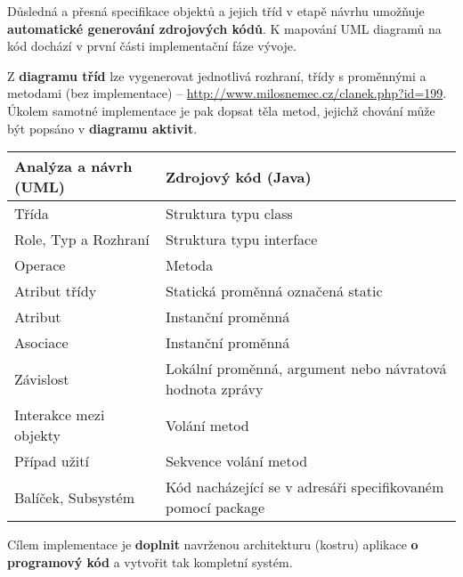 Důsledná a přesná specifikace {objektů} a jejich {tříd} v etapě návrhu umožňuje\textbf{ automatické generování zdrojových kódů}. K mapování UML diagramů na kód dochází v první části implementační fáze vývoje.

Z \textbf{diagramu tříd} lze vygenerovat jednotlivá rozhraní, třídy s proměnnými a metodami (bez implementace) -- \url{http://www.milosnemec.cz/clanek.php?id=199}. Úkolem samotné implementace je pak dopsat těla metod, jejichž chování může být popsáno v \textbf{diagramu aktivit}.

\begin{table}[H]
  \centering
  \begin{tabular}{|l|l|}
    \hline
    \textbf{Analýza a návrh (UML)} & \textbf{Zdrojový kód (Java)}                                \\ \hline
    Třída                          & Struktura typu class                                        \\ \hline
    Role, Typ a Rozhraní           & Struktura typu interface                                    \\ \hline
    Operace                        & Metoda                                                      \\ \hline
    Atribut třídy                  & Statická proměnná označená static                           \\ \hline
    Atribut                        & Instanční proměnná                                          \\ \hline
    Asociace                       & Instanční proměnná                                          \\ \hline
    Závislost                      & Lokální proměnná, argument nebo návratová hodnota zprávy    \\ \hline
    Interakce mezi objekty         & Volání metod                                                \\ \hline
    Případ užití                   & Sekvence volání metod                                       \\ \hline
    Balíček, Subsystém             & Kód nacházející se v adresáři specifikovaném pomocí package \\ \hline
  \end{tabular}
\end{table}

Cílem implementace je \textbf{doplnit} navrženou architekturu (kostru) aplikace \textbf{o programový kód} a vytvořit tak kompletní systém.

